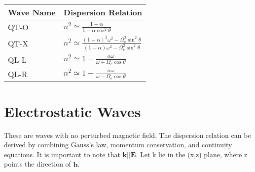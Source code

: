 \begin{table}[h!]
  \centering
  \begin{tabular} {l l}
    \hline
    Wave Name \T\B &  Dispersion Relation \\
    \hline\hline
    QT-O \T& $n^{2} \simeq \frac{1-\alpha}{1-\alpha \cos^{2} \theta}$ \\[5pt]
    QT-X   & $n^{2} \simeq \frac{\left( 1-\alpha \right)^{2} \omega^{2} - \Omega_{e}^{2} \sin^{2} \theta}{\left(1-\alpha \right) \omega^{2} - \Omega_{e}^{2} \sin^{2} \theta}$ \\[5pt]
    QL-L   & $n^{2} \simeq 1- \frac{\alpha \omega}{\omega + \Omega_{e} \cos \theta} $\\[5pt]
    QL-R \B& $n^{2} \simeq 1- \frac{\alpha \omega}{\omega - \Omega_{e} \cos \theta }$ \\[5pt]
    \hline
  \end{tabular}
\end{table}


\section{Electrostatic Waves}

\noindent These are waves with no perturbed magnetic field. The
dispersion relation can be derived by combining Gauss's law, momentum
conservation, and continuity equations. It is important to note that
$\textbf{k} || \textbf{E}$. Let k lie in the (x,z) plane, where z
points the direction of $\hat{\textbf{b}}$. \cite{porkolab}



